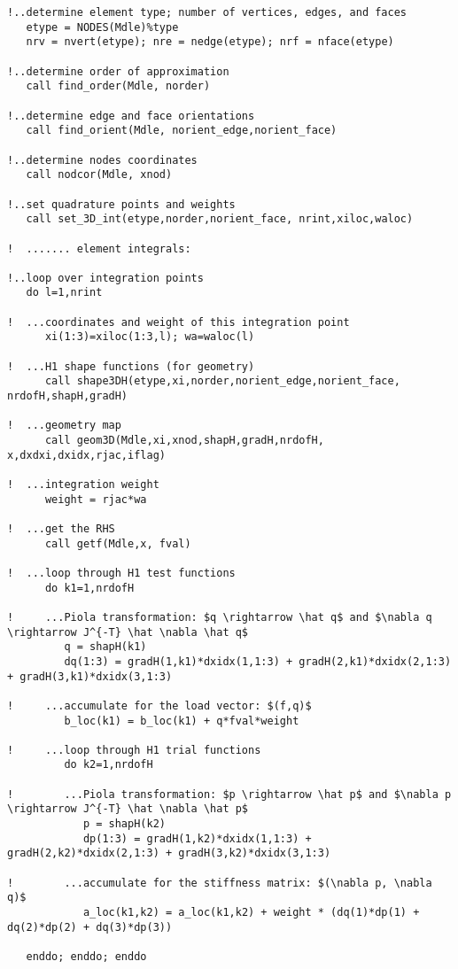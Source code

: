 \begin{lstlisting}[caption=\file{MPI\_POISSON/GALERKIN/common/}\routine{elem} routine]
!..determine element type; number of vertices, edges, and faces
   etype = NODES(Mdle)%type
   nrv = nvert(etype); nre = nedge(etype); nrf = nface(etype)
   
!..determine order of approximation
   call find_order(Mdle, norder)
   
!..determine edge and face orientations
   call find_orient(Mdle, norient_edge,norient_face)
   
!..determine nodes coordinates
   call nodcor(Mdle, xnod)
   
!..set quadrature points and weights
   call set_3D_int(etype,norder,norient_face, nrint,xiloc,waloc)

!  ....... element integrals:

!..loop over integration points
   do l=1,nrint

!  ...coordinates and weight of this integration point
      xi(1:3)=xiloc(1:3,l); wa=waloc(l)

!  ...H1 shape functions (for geometry)
      call shape3DH(etype,xi,norder,norient_edge,norient_face, nrdofH,shapH,gradH)

!  ...geometry map
      call geom3D(Mdle,xi,xnod,shapH,gradH,nrdofH, x,dxdxi,dxidx,rjac,iflag)

!  ...integration weight
      weight = rjac*wa

!  ...get the RHS
      call getf(Mdle,x, fval)

!  ...loop through H1 test functions
      do k1=1,nrdofH

!     ...Piola transformation: $q \rightarrow \hat q$ and $\nabla q \rightarrow J^{-T} \hat \nabla \hat q$
         q = shapH(k1)
         dq(1:3) = gradH(1,k1)*dxidx(1,1:3) + gradH(2,k1)*dxidx(2,1:3) + gradH(3,k1)*dxidx(3,1:3)

!     ...accumulate for the load vector: $(f,q)$
         b_loc(k1) = b_loc(k1) + q*fval*weight

!     ...loop through H1 trial functions
         do k2=1,nrdofH

!        ...Piola transformation: $p \rightarrow \hat p$ and $\nabla p \rightarrow J^{-T} \hat \nabla \hat p$
            p = shapH(k2)
            dp(1:3) = gradH(1,k2)*dxidx(1,1:3) + gradH(2,k2)*dxidx(2,1:3) + gradH(3,k2)*dxidx(3,1:3)

!        ...accumulate for the stiffness matrix: $(\nabla p, \nabla q)$
            a_loc(k1,k2) = a_loc(k1,k2) + weight * (dq(1)*dp(1) + dq(2)*dp(2) + dq(3)*dp(3))

   enddo; enddo; enddo
\end{lstlisting}

